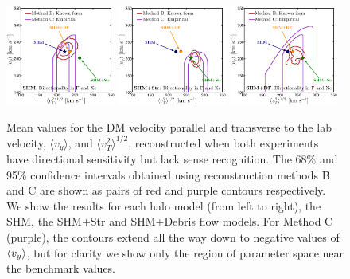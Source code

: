 \label{sec:folded}
\begin{figure}[t]
	\includegraphics[width=0.32\textwidth]{Figures/vyvT-SHM-Xe-D-F-D-folded.eps}
	\includegraphics[width=0.32\textwidth]{Figures/vyvT-STR-Xe-D-F-D-folded.eps}
	\includegraphics[width=0.32\textwidth]{Figures/vyvT-DF-Xe-D-F-D-folded.eps}
    \caption[Reconstructed parallel and transverse velocities with folded data]{Mean values for the DM velocity parallel and transverse to the lab velocity, $\langle v_y \rangle$, and $\langle v_T^2 \rangle^{1/2}$, reconstructed when both experiments have directional sensitivity but lack sense recognition. The 68\% and 95\% confidence intervals obtained using reconstruction methods B and C are shown as pairs of red and purple contours respectively. We show the results for each halo model (from left to right), the SHM, the SHM+Str and SHM+Debris flow models. For Method C (purple), the contours extend all the way down to negative values of $\langle v_y \rangle$, but for clarity we show only the region of parameter space near the benchmark values.}\label{fig:vyvT-folded}
\end{figure}
